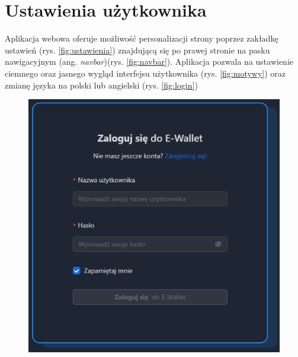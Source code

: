 \section{Ustawienia użytkownika}
Aplikacja webowa oferuje możliwość personalizacji strony poprzez zakładkę ustawień (rys. \ref{fig:ustawienia}) znajdującą się po prawej stronie na pasku nawigacyjnym (ang. \textit{navbar})(rys. \ref{fig:navbar}). Aplikacja pozwala na ustawienie ciemnego oraz jasnego wygląd interfejsu użytkownika (rys. \ref{fig:motywy}) oraz zmianę języka na polski lub angielski (rys. \ref{fig:login})
\begin{figure}[H]
\begin{minipage}{0.5\textwidth}
	\centering
	\includegraphics[width=\linewidth]{images/Login}
\end{minipage}
\hfill
\begin{minipage}{0.5\textwidth}
	\centering

\end{minipage}
\end{figure}
